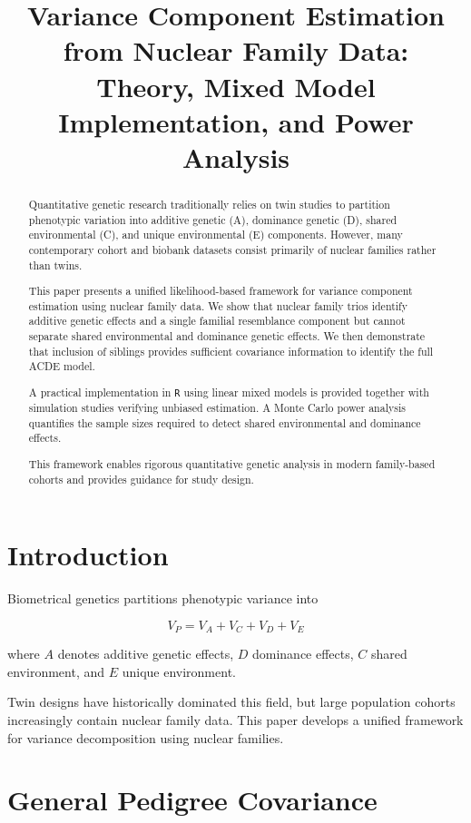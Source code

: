 \documentclass[12pt]{article}
\title{Variance Component Estimation from Nuclear Family Data:\\
Theory, Mixed Model Implementation, and Power Analysis}
\author{}
\date{}
\begin{document}
\maketitle

\begin{abstract}
Quantitative genetic research traditionally relies on twin studies to
partition phenotypic variation into additive genetic (A), dominance genetic
(D), shared environmental (C), and unique environmental (E) components.
However, many contemporary cohort and biobank datasets consist primarily
of nuclear families rather than twins.

This paper presents a unified likelihood-based framework for variance
component estimation using nuclear family data. We show that nuclear
family trios identify additive genetic effects and a single familial
resemblance component but cannot separate shared environmental and
dominance genetic effects. We then demonstrate that inclusion of siblings
provides sufficient covariance information to identify the full ACDE model.

A practical implementation in \texttt{R} using linear mixed models is
provided together with simulation studies verifying unbiased estimation.
A Monte Carlo power analysis quantifies the sample sizes required to detect
shared environmental and dominance effects.

This framework enables rigorous quantitative genetic analysis in modern
family-based cohorts and provides guidance for study design.

\end{abstract}

\section{Introduction}

Biometrical genetics partitions phenotypic variance into

\[
V_P = V_A + V_C + V_D + V_E
\]

where $A$ denotes additive genetic effects, $D$ dominance effects,
$C$ shared environment, and $E$ unique environment.

Twin designs have historically dominated this field, but large
population cohorts increasingly contain nuclear family data.
This paper develops a unified framework for variance decomposition
using nuclear families.

\section{General Pedigree Covariance}
\end{document}
